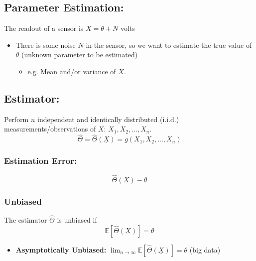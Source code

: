 \begin{faq}

\end{faq}

\subsection{Parameter Estimation:}
\begin{motivation}
    The readout of a sensor is $X = \theta + N$ volts
    \begin{itemize}
        \item There is some noise $N$ in the sensor, so we want to estimate the true value of $\theta$ (unknown parameter to be estimated)
        \begin{itemize}
            \item e.g. Mean and/or variance of $X$. 
        \end{itemize}
    \end{itemize}
\end{motivation}

\subsection{Estimator:}
\begin{definition}
    Perform $n$ independent and identically distributed (i.i.d.) measurements/observations of $X$: $X_1, X_2, \ldots, X_n$.
    \begin{equation}
        \hat{\Theta} = \hat{\Theta}(\underline{X}) = g(X_1, X_2, \ldots, X_n) 
    \end{equation}
\end{definition}

\subsubsection{Estimation Error:}
\begin{definition}
    \begin{equation}
        \hat{\Theta}(\underline{X}) - \theta
    \end{equation}
\end{definition}

\subsubsection{Unbiased}
\begin{definition}
    The estimator $\hat{\Theta}$ is unbiased if 
    \begin{equation}
        \mathbb{E}[\hat{\Theta}(\underline{X})] = \theta
    \end{equation}
    \begin{itemize}
        \item \textbf{Asymptotically Unbiased:} $\lim_{n \to \infty} \mathbb{E}[\hat{\Theta}(\underline{X})] = \theta$ (big data)
    \end{itemize}
\end{definition}

